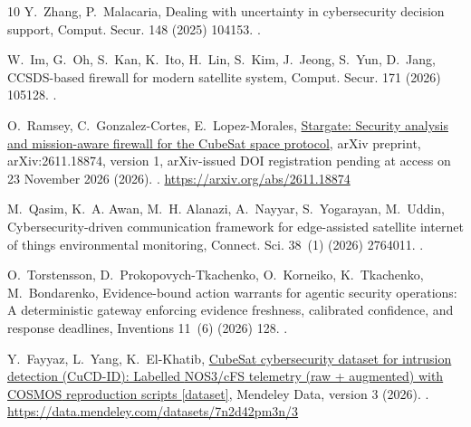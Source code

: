 \documentclass[preprint,12pt]{elsarticle}
\begin{document}
\begin{thebibliography}{10}
Y.~Zhang, P.~Malacaria, Dealing with uncertainty in cybersecurity decision
  support, Comput. Secur. 148 (2025) 104153.
\newblock \href {https://doi.org/10.1016/j.cose.2024.104153}
  {}.

W.~Im, G.~Oh, S.~Kan, K.~Ito, H.~Lin, S.~Kim, J.~Jeong, S.~Yun, D.~Jang,
  {CCSDS}-based firewall for modern satellite system, Comput. Secur. 171 (2026)
  105128.
\newblock \href {https://doi.org/10.1016/j.cose.2026.105128}
  {}.

O.~Ramsey, C.~Gonzalez-Cortes, E.~Lopez-Morales,
  \href{https://arxiv.org/abs/2611.18874}{Stargate: Security analysis and
  mission-aware firewall for the {CubeSat} space protocol}, arXiv preprint,
  arXiv:2611.18874, version 1, arXiv-issued DOI registration pending at access
  on 23 November 2026 (2026).
\newblock \href {https://doi.org/10.48550/arXiv.2611.18874}
  {}.
\newline\urlprefix\url{https://arxiv.org/abs/2611.18874}

M.~Qasim, K.~A. Awan, M.~H. Alanazi, A.~Nayyar, S.~Yogarayan, M.~Uddin,
  Cybersecurity-driven communication framework for edge-assisted satellite
  internet of things environmental monitoring, Connect. Sci. 38~(1) (2026)
  2764011.
\newblock \href {https://doi.org/10.1080/09540091.2026.2764011}
  {}.

O.~Torstensson, D.~Prokopovych-Tkachenko, O.~Korneiko, K.~Tkachenko,
  M.~Bondarenko, Evidence-bound action warrants for agentic security
  operations: A deterministic gateway enforcing evidence freshness, calibrated
  confidence, and response deadlines, Inventions 11~(6) (2026) 128.
\newblock \href {https://doi.org/10.3390/inventions11060128}
  {}.

Y.~Fayyaz, L.~Yang, K.~El-Khatib,
  \href{https://data.mendeley.com/datasets/7n2d42pm3n/3}{{CubeSat}
  cybersecurity dataset for intrusion detection ({CuCD-ID}): Labelled
  {NOS3/cFS} telemetry (raw + augmented) with {COSMOS} reproduction scripts
  {[dataset]}}, Mendeley Data, version 3 (2026).
\newblock \href {https://doi.org/10.17632/7n2d42pm3n.3}
  {}.
\newline\urlprefix\url{https://data.mendeley.com/datasets/7n2d42pm3n/3}


\end{thebibliography}
\end{document}
